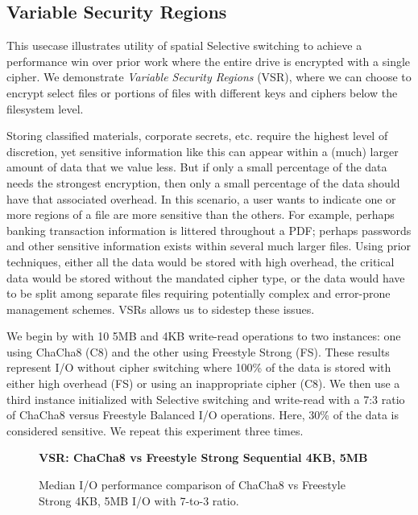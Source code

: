 \subsection{Variable Security Regions} \label{subsec:uc2}

This usecase illustrates utility of spatial Selective switching to achieve a
performance win over prior work where the entire drive is encrypted with a
single cipher. We demonstrate \emph{Variable Security Regions} (VSR), where we
can choose to encrypt select files or portions of files with different keys and
ciphers below the filesystem level.

Storing classified materials, corporate secrets, etc. require the highest level
of discretion, yet sensitive information like this can appear within a (much)
larger amount of data that we value less. But if only a small percentage of the
data needs the strongest encryption, then only a small percentage of the data
should have that associated overhead. In this scenario, a user wants to indicate
one or more regions of a file are more sensitive than the others. For example,
perhaps banking transaction information is littered throughout a PDF; perhaps
passwords and other sensitive information exists within several much larger
files. Using prior techniques, either all the data would be stored with high
overhead, the critical data would be stored without the mandated cipher type, or
the data would have to be split among separate files requiring potentially
complex and error-prone management schemes. \sys{} VSRs allows us to
sidestep these issues.

We begin by with 10 5MB and 4KB write-read operations to two
\sys{} instances: one using ChaCha8 (C8) and the other using Freestyle
Strong (FS). These results represent I/O without cipher switching where 100\% of
the data is stored with either high overhead (FS) or using an inappropriate
cipher (C8). We then use a third \sys{} instance initialized with Selective
switching and write-read with a 7:3 ratio of ChaCha8 versus Freestyle
Balanced I/O operations. Here, 30\% of the data is considered sensitive. We
repeat this experiment three times.

\begin{figure}[ht] \textbf{VSR: ChaCha8 vs Freestyle Strong Sequential
    4KB, 5MB}\par\medskip \centering
  {} \caption{Median I/O performance
    comparison of ChaCha8 vs Freestyle Strong 4KB, 5MB I/O with 7-to-3
    ratio. }
  \label{fig:usecase-vsr-bar}
\end{figure}

